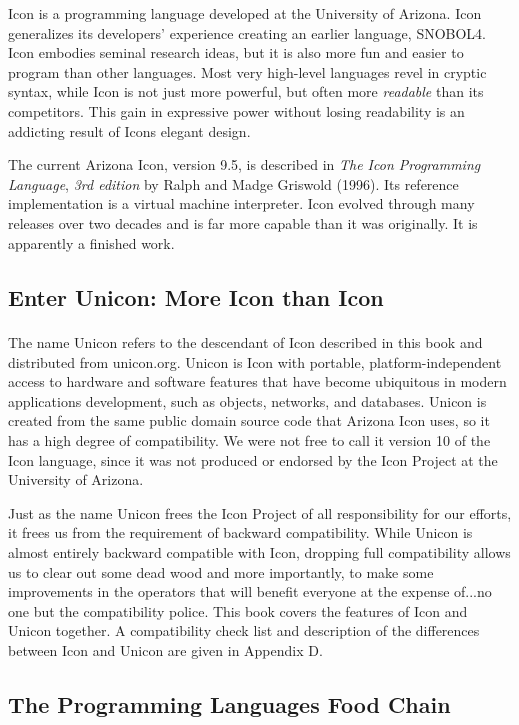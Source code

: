 Icon is a programming language developed
at the University of Arizona. Icon generalizes its developers' experience
creating an earlier language, SNOBOL4. Icon
embodies seminal research ideas, but it is also more fun and
easier to program than other languages.  Most very high-level
languages revel in cryptic syntax, while Icon
is not just more powerful, but often more
\textit{readable} than its competitors. This
gain in expressive power without losing readability is an
addicting result of Icon{\textquotesingle}s elegant design.

The current Arizona Icon, version 9.5, is described in
\textit{The Icon Programming Language}, \textit{3rd edition} by Ralph
and Madge Griswold (1996). Its reference implementation is a
virtual machine interpreter. Icon evolved through many releases
over two decades and is far more capable than it was originally. It is
apparently a finished work.

\subsection{Enter Unicon: More Icon than Icon}

The name Unicon\textbf{\textsuperscript{ }}refers to the descendant of
Icon described in this book and distributed from unicon.org. Unicon is
Icon with portable, platform-independent access to hardware and
software features that have become ubiquitous in modern
applications development, such as objects, networks, and databases.
Unicon is created from the same public domain source code that Arizona
Icon uses, so it has a high degree of compatibility. We were not
free to call it version 10 of the Icon
language, since it was not produced or endorsed by the Icon Project at
the University of Arizona.

Just as the name Unicon frees the Icon Project of all responsibility for
our efforts, it frees us from the requirement of backward
compatibility. While Unicon is almost entirely backward compatible
with Icon, dropping full
compatibility allows us to clear out some dead wood and more
importantly, to make some improvements in the operators that will
benefit everyone at the expense of...no one but the compatibility
police.
This book covers the features of Icon and Unicon together. A
compatibility check list and description of the differences
between Icon and Unicon are given in Appendix D.

\subsection{The Programming Languages Food Chain}

